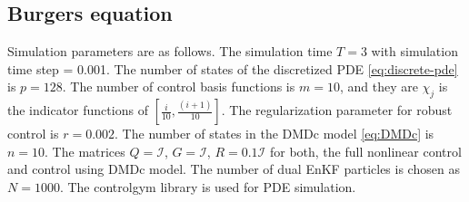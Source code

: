 \documentclass[letterpaper, 10 pt, conference]{ieeeconf}  %
\newcommand{\todo}[1]{{\color{blue} #1}}
\newcommand{\id}{\mathcal{I}}
\begin{document}
\subsection{Burgers equation}
\label{app:burgers}
Simulation parameters are as follows. The simulation time $T = 3$ %
with simulation time step = 0.001. 
The number of states of the discretized PDE \eqref{eq:discrete-pde} is $p=128$. 
The number of control basis functions is $m=10$, and they are $\chi_j$ is the indicator functions of $[\frac{i}{10},\frac{(i+1)}{10}]$. The regularization parameter for robust control is $r = 0.002$.
The number of states in the DMDc model \eqref{eq:DMDc} is $n=10$. The matrices  $Q = \id$, $G=\id$, $R=0.1\id$ for both, the full nonlinear control and control using DMDc model.
The number of dual EnKF particles is chosen as $N=1000$. 
The controlgym library \cite{zhang2023controlgym} is used for PDE simulation. 
\end{document}
